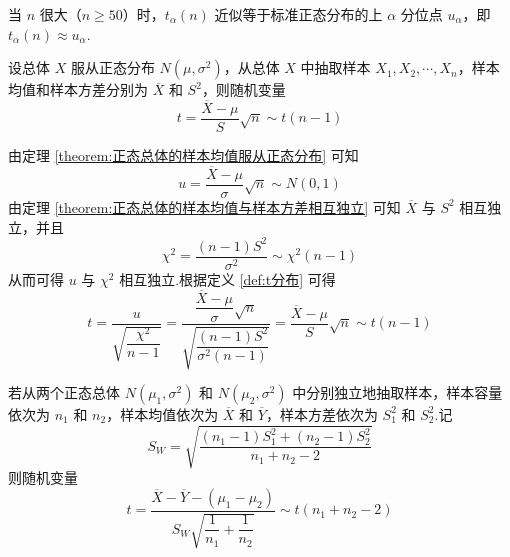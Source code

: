 当 $n$ 很大（$n \geqslant 50$）时，$t_{\alpha}(n)$ 近似等于标准正态分布的上 $\alpha$ 分位点 $u_{\alpha}$，即 $t_{\alpha}(n) \approx u_{\alpha}$.

\begin{theorem}
    设总体 $X$ 服从正态分布 $N(\mu,\sigma^2)$，从总体 $X$ 中抽取样本 $X_1,X_2,\cdots,X_n$，样本均值和样本方差分别为 $\overline{X}$ 和 $S^2$，则随机变量
    $$
    t = \dfrac{\overline{X} - \mu}{S} \sqrt{n} \sim t(n-1)
    $$
\end{theorem}

\begin{myproof}
    由定理 \ref{theorem:正态总体的样本均值服从正态分布} 可知
    $$
    u = \dfrac{\overline{X} - \mu}{\sigma} \sqrt{n} \sim N(0,1)
    $$
    由定理 \ref{theorem:正态总体的样本均值与样本方差相互独立} 可知 $\overline{X}$ 与 $S^2$ 相互独立，并且
    $$
    \chi^2 = \dfrac{(n-1) S^2}{\sigma^2} \sim \chi^2(n-1)
    $$
    从而可得 $u$ 与 $\chi^2$ 相互独立.根据定义 \ref{def:t分布} 可得
    $$
    t = \dfrac{u}{\sqrt{\dfrac{\chi^2}{n-1}}} = \dfrac{\dfrac{\overline{X} - \mu}{\sigma} \sqrt{n}}{\sqrt{\dfrac{(n-1) S^2}{\sigma^2 (n-1)}}} = \dfrac{\overline{X} - \mu}{S} \sqrt{n} \sim t(n-1)
    $$
\end{myproof}

\begin{theorem}
    若从两个正态总体 $N(\mu_1, \sigma^2)$ 和 $N(\mu_2, \sigma^2)$ 中分别独立地抽取样本，样本容量依次为 $n_1$ 和 $n_2$，样本均值依次为 $\overline{X}$ 和 $\overline{Y}$，样本方差依次为 $S_1^2$ 和 $S_2^2$.记
    $$
    S_W = \sqrt{\dfrac{(n_1 - 1) S_1^2 + (n_2 - 1) S_2^2}{n_1 + n_2 - 2}}
    $$
    则随机变量
    $$
    t = \dfrac{\overline{X} - \overline{Y} - (\mu_1 - \mu_2)}{S_W \sqrt{\dfrac{1}{n_1} + \dfrac{1}{n_2}}} \sim t(n_1 + n_2 - 2)
    $$
\end{theorem}

